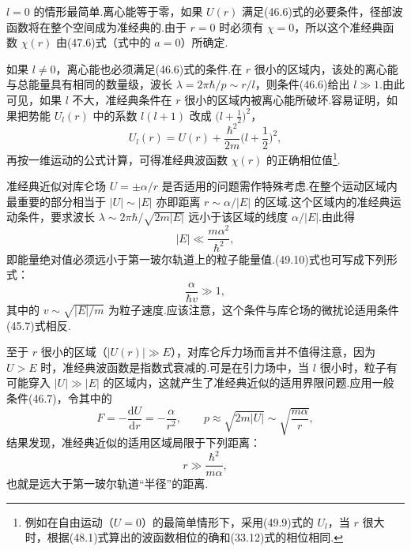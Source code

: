 $l=0$ 的情形最简单.离心能等于零，如果 $U(r)$ 满足(46.6)式的必要条件，径部波函数将在整个空间成为准经典的.由于 $r=0$ 时必须有 $\chi=0$，所以这个准经典函数 $\chi(r)$ 由(47.6)式（式中的 $a=0$）所确定.

如果 $l\neq0$，离心能也必须满足(46.6)式的条件.在 $r$ 很小的区域内，该处的离心能与总能量具有相同的数量级，波长 $\lambda=2\pi\hbar/p\sim r/l$，则条件(46.6)给出 $l\gg1$.由此可见，如果 $l$ 不大，准经典条件在 $r$ 很小的区域内被离心能所破坏.容易证明，如果把势能 $U_l(r)$ 中的系数 $l(l+1)$ 改成 $\big(l+\frac{1}{2}\big)^2$，
\begin{equation}
  U_l(r)=U(r)+\frac{\hbar^2}{2m}\bigg(l+\frac{1}{2}\bigg)^2,
\end{equation}
再按一维运动的公式计算，可得准经典波函数 $\chi(r)$ 的正确相位值\footnote{例如在自由运动（$U=0$）的最简单情形下，采用(49.9)式的 $U_l$，当 $r$ 很大时，根据(48.1)式算出的波函数相位的确和(33.12)式的相位相同.}.

准经典近似对库仑场 $U=\pm\alpha/r$ 是否适用的问题需作特殊考虑.在整个运动区域内最重要的部分相当于 $|U|\sim|E|$ 亦即距离 $r\sim\alpha/|E|$ 的区域.这个区域内的准经典运动条件，要求波长 $\lambda\sim2\pi\hbar/\sqrt{2m|E|}$ 远小于该区域的线度 $\alpha/|E|$.由此得
\begin{equation}
  |E|\ll\frac{m\alpha^2}{\hbar^2},
\end{equation}
即能量绝对值必须远小于第一玻尔轨道上的粒子能量值.(49.10)式也可写成下列形式：
\begin{equation}
  \frac{\alpha}{\hbar v}\gg1,
\end{equation}
其中的 $v\sim\sqrt{|E|/m}$ 为粒子速度.应该注意，这个条件与库仑场的微扰论适用条件(45.7)式相反.

至于 $r$ 很小的区域（$|U(r)|\gg E$），对库仑斥力场而言并不值得注意，因为 $U>E$ 时，准经典波函数是指数式衰减的.可是在引力场中，当 $l$ 很小时，粒子有可能穿入 $|U|\gg|E|$ 的区域内，这就产生了准经典近似的适用界限问题.应用一般条件(46.7)，令其中的
\begin{equation*}
  F=-\frac{\mathrm{d}U}{\mathrm{d}r}=-\frac{\alpha}{r^2},\qquad
  p\approx\sqrt{2m|U|}\sim\sqrt{\frac{m\alpha}{r}},
\end{equation*}
结果发现，准经典近似的适用区域局限于下列距离：
\begin{equation}
  r\gg\frac{\hbar^2}{m\alpha},
\end{equation}
也就是远大于第一玻尔轨道“半径”的距离.

